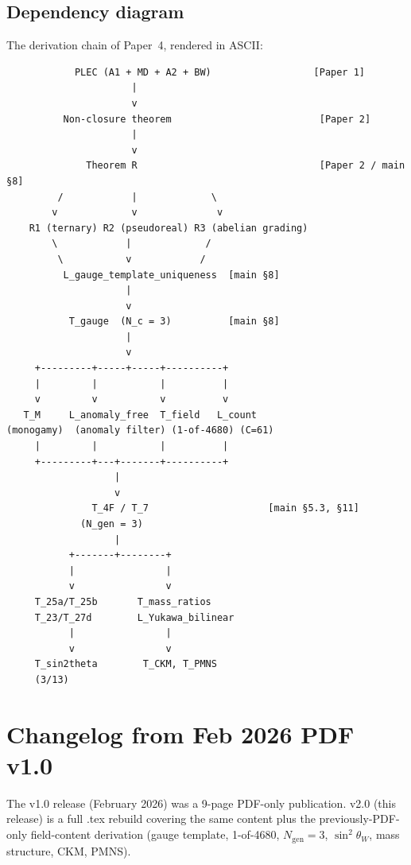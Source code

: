 \documentclass[11pt]{article}
\theoremstyle{definition}
\begin{document}
\subsection{Dependency diagram}\label{sec:dependency_diagram}

The derivation chain of Paper~4, rendered in ASCII:

\begin{verbatim}
            PLEC (A1 + MD + A2 + BW)                  [Paper 1]
                      |
                      v
          Non-closure theorem                          [Paper 2]
                      |
                      v
              Theorem R                                [Paper 2 / main §8]
         /            |             \
        v             v              v
    R1 (ternary) R2 (pseudoreal) R3 (abelian grading)
        \            |             /
         \           v            /
          L_gauge_template_uniqueness  [main §8]
                     |
                     v
           T_gauge  (N_c = 3)          [main §8]
                     |
                     v
     +---------+-----+-----+----------+
     |         |           |          |
     v         v           v          v
   T_M     L_anomaly_free  T_field   L_count
(monogamy)  (anomaly filter) (1-of-4680) (C=61)
     |         |           |          |
     +---------+---+-------+----------+
                   |
                   v
               T_4F / T_7                     [main §5.3, §11]
             (N_gen = 3)
                   |
           +-------+--------+
           |                |
           v                v
     T_25a/T_25b       T_mass_ratios
     T_23/T_27d        L_Yukawa_bilinear
           |                |
           v                v
     T_sin2theta        T_CKM, T_PMNS
     (3/13)
\end{verbatim}

\clearpage

\section{Changelog from Feb 2026 PDF v1.0}\label{sec:changelog}

The v1.0 release (February 2026) was a 9-page PDF-only publication. v2.0 (this release) is a full .tex rebuild covering the same content plus the previously-PDF-only field-content derivation (gauge template, 1-of-4680, $N_{\mathrm{gen}} = 3$, $\sin^2\theta_W$, mass structure, CKM, PMNS).
\end{document}
